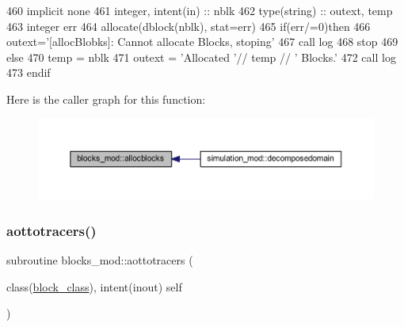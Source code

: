 \begin{DoxyCode}
460     \textcolor{keywordtype}{implicit none}
461     \textcolor{keywordtype}{integer}, \textcolor{keywordtype}{intent(in)} ::  nblk
462     \textcolor{keywordtype}{type}(string) :: outext, temp
463     \textcolor{keywordtype}{integer} err
464     \textcolor{keyword}{allocate}(dblock(nblk), stat=err)
465     \textcolor{keywordflow}{if}(err/=0)\textcolor{keywordflow}{then}
466         outext=\textcolor{stringliteral}{'[allocBlobks]: Cannot allocate Blocks, stoping'}
467         \textcolor{keyword}{call }log%
468         stop
469     \textcolor{keywordflow}{else}
470         temp = nblk
471         outext = \textcolor{stringliteral}{'Allocated '}// temp // \textcolor{stringliteral}{' Blocks.'}
472         \textcolor{keyword}{call }log%
473 \textcolor{keywordflow}{    endif}
\end{DoxyCode}
Here is the caller graph for this function\+:\nopagebreak
\begin{figure}[H]
\begin{center}
\leavevmode
\includegraphics[width=350pt]{namespaceblocks__mod_a639beb0fee2290d46353f4b4702d6711_icgraph}
\end{center}
\end{figure}
\mbox{\label{namespaceblocks__mod_a27c7e788c5f3979bfe9d43aad138286a}} 
\subsubsection{\texorpdfstring{aottotracers()}{aottotracers()}}
{\footnotesize\ttfamily subroutine blocks\+\_\+mod\+::aottotracers (\begin{DoxyParamCaption}\item[{class(\mbox{\hyperlink{structblocks__mod_1_1block__class}{block\+\_\+class}}), intent(inout)}]{self }\end{DoxyParamCaption})\hspace{0.3cm}{\ttfamily [private]}}



